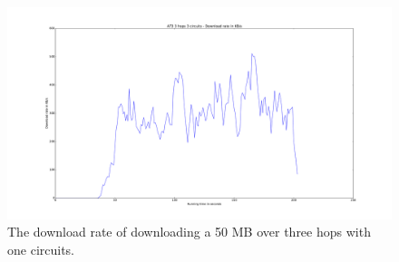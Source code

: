  		\begin{figure}[!htb]
			\centering
			\includegraphics[width=\textwidth]{graphics/download_rate_3_hops_3_circuits.pdf}
			\caption{The download rate of downloading a 50 MB over three hops with one circuits.}
			\label{fig:download_rate_3_hops_3_circuits}
		\end{figure}
		
\newpage